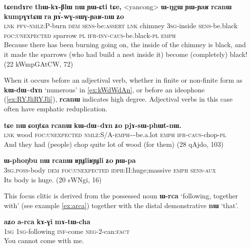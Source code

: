 \documentclass[oldfontcommands,oneside,a4paper,11pt]{article}
\newcommand{\ipa}[1]{\mbox{\phon\textbf{#1}}} %
\begin{document}
\begin{exe}
\ex \label{ex:YAwGsWGYaRnW}
\gll 
\ipa{tɕendɤre} 	\ipa{thɯ-kɤ-βlɯ} 	\ipa{nɯ} 	\ipa{ɲɯ-ɕti} 	\ipa{tɕe,} 	<yancong>	 \ipa{ɯ-ŋgɯ} 	\ipa{ɲɯ-ɲaʁ} 	\ipa{rcanɯ} 	\ipa{kumpɣɤtɕɯ} 	\ipa{ra} 	\ipa{ɲɤ́-wɣ-sɯɣ-ɲaʁ-nɯ} 	\ipa{ʑo} 	\\
\textsc{lnk} \textsc{pfv-nmlz}:P-burn \textsc{dem} \textsc{sens}-be:\textsc{assert} \textsc{lnk} chimney \textsc{3sg}-inside \textsc{sens}-be.black \textsc{foc:unexpected} sparrow \textsc{pl} \textsc{ifr-inv-caus}-be.black-\textsc{pl} \textsc{emph} \\
\glt Because there has been burning going on, the inside of the chimney is black, and it made the sparrows (who had build a nest inside it) become (completely) black! (22 kWmpGAtCW, 72)
\end{exe}
When it occurs before an adjectival verb, whether in finite or non-finite form as \ipa{kɯ-dɯ\textasciitilde{}dɤn} `numerous' in \ref{ex:kWdWdAn}, or before an ideophone (\ref{ex:RYJliRYJli}), \ipa{rcanɯ} indicates high degree. Adjectival verbs in this case often have emphatic reduplication.

\begin{exe}
\ex \label{ex:kWdWdAn}
\gll \ipa{tɕe} 	\ipa{nɯ} 	\ipa{ɕoŋtɕa} 	\ipa{rcanɯ} 	\ipa{kɯ-dɯ\textasciitilde{}dɤn} 	\ipa{ʑo} 	\ipa{pjɤ-sɯ-phɯt-nɯ.} \\
\textsc{lnk} wood \textsc{foc:unexpected} \textsc{nmlz}:S/A-\textsc{emph}\textasciitilde{}-be.a.lot \textsc{emph} \textsc{ifr-caus}-chop-\textsc{pl}\\
\glt And they had (people) chop quite lot of wood (for them) (28 qAjdo,  103)
\end{exe}

\begin{exe}
\ex \label{ex:RYJliRYJli}
\gll
\ipa{ɯ-phoŋbu} 	\ipa{nɯ} 	\ipa{rcanɯ} 	\ipa{ʁɲɟliʁɲɟli} 	\ipa{ʑo} 	\ipa{ɲɯ-pa} \\
\textsc{3sg.poss}-body \textsc{dem}  \textsc{foc:unexpected} \textsc{idph}:II:huge;massive \textsc{emph} \textsc{sens}-\textsc{aux} \\
\glt Its body is huge. (20 sWNgi,  16)
\end{exe}

This focus clitic is derived from the possessed noun  \ipa{ɯ-rca} `following, together with' (see example \ref{ex:arca}) together with the distal demonstrative \ipa{nɯ} `that'.

\begin{exe}
\ex \label{ex:arca}
\gll
\ipa{aʑo} 	\ipa{a-rca} 	\ipa{kɤ-ɣi} 	\ipa{mɤ-tɯ-cha} \\
\textsc{1sg} \textsc{1sg}-following \textsc{inf}-come \textsc{neg}-2-can:\textsc{fact} \\
\glt You cannot come with me.
\end{exe}
 
\end{document}
